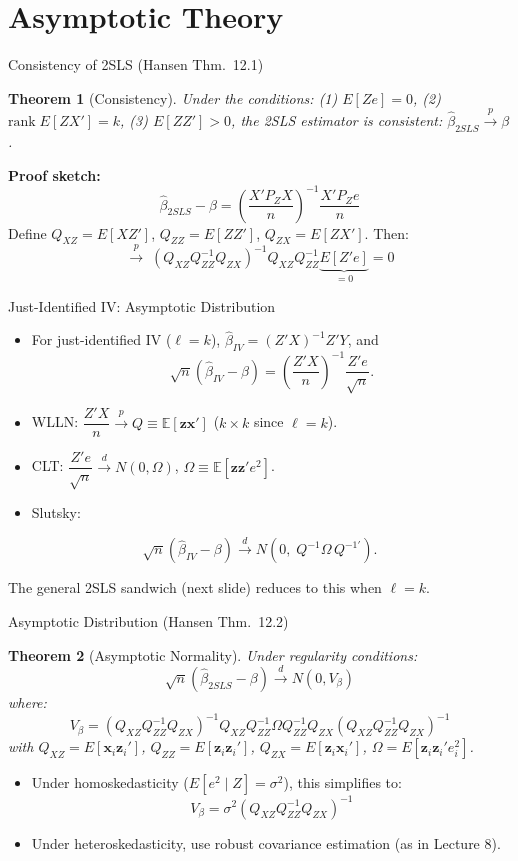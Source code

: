 \documentclass[aspectratio=169, handout]{beamer}
\newtheorem{thm}{Theorem}
\numberwithin{equation}{section}
\begin{document}
\section{Asymptotic Theory}

\begin{frame}{Consistency of 2SLS (Hansen Thm.\ 12.1)}
\begin{thm}[Consistency]
Under the conditions: (1) $E[Ze]=0$, (2) $\text{rank}\;E[ZX']=k$, (3) $E[ZZ']>0$, the 2SLS estimator is consistent: $\hat{\beta}_{2SLS}\xrightarrow{p}\beta$.
\end{thm}
\vspace{0.2cm}
\textbf{Proof sketch:}
$$\hat{\beta}_{2SLS}-\beta = \left(\frac{X'P_ZX}{n}\right)^{-1}\frac{X'P_Ze}{n}$$
Define $Q_{XZ}=E[XZ']$, $Q_{ZZ}=E[ZZ']$, $Q_{ZX}=E[ZX']$.  Then:
$$\xrightarrow{p}\; (Q_{XZ}Q_{ZZ}^{-1}Q_{ZX})^{-1}Q_{XZ}Q_{ZZ}^{-1}\underbrace{E[Z'e]}_{=0} = 0$$
\end{frame}


\begin{frame}{Just-Identified IV: Asymptotic Distribution}
\begin{itemize}
\item For just-identified IV ($\ell=k$), $\hat{\beta}_{IV}=(Z'X)^{-1}Z'Y$, and
$$\sqrt{n}(\hat{\beta}_{IV}-\beta) = \left(\frac{Z'X}{n}\right)^{-1}\frac{Z'e}{\sqrt{n}}.$$
\item WLLN: $\dfrac{Z'X}{n}\xrightarrow{p}Q\equiv\mathbb{E}[\bm{z}\bm{x}']$ ($k\times k$ since $\ell=k$).
\item CLT: $\dfrac{Z'e}{\sqrt{n}}\xrightarrow{d} N(0,\Omega)$, $\Omega\equiv\mathbb{E}[\bm{z}\bm{z}'e^2]$.
\item Slutsky:
\end{itemize}
\begin{tcolorbox}[colback=blue!5, colframe=blue!50]
$$\sqrt{n}(\hat{\beta}_{IV}-\beta)\xrightarrow{d} N\!\left(0,\;Q^{-1}\Omega\, Q^{-1\prime}\right).$$
\end{tcolorbox}
The general 2SLS sandwich (next slide) reduces to this when $\ell=k$.
\end{frame}


\begin{frame}{Asymptotic Distribution (Hansen Thm.\ 12.2)}
\begin{thm}[Asymptotic Normality]
Under regularity conditions:
$$\sqrt{n}(\hat{\beta}_{2SLS}-\beta)\xrightarrow{d} N(0, V_\beta)$$
where:
$$V_\beta = (Q_{XZ}Q_{ZZ}^{-1}Q_{ZX})^{-1}Q_{XZ}Q_{ZZ}^{-1}\Omega Q_{ZZ}^{-1}Q_{ZX}(Q_{XZ}Q_{ZZ}^{-1}Q_{ZX})^{-1}$$
with $Q_{XZ}=E[\bm{x}_i\bm{z}_i']$, $Q_{ZZ}=E[\bm{z}_i\bm{z}_i']$, $Q_{ZX}=E[\bm{z}_i\bm{x}_i']$, $\Omega=E[\bm{z}_i\bm{z}_i'e_i^2]$.
\end{thm}
\begin{itemize}
\item Under homoskedasticity ($E[e^2\mid Z]=\sigma^2$), this simplifies to:
$$V_\beta = \sigma^2(Q_{XZ}Q_{ZZ}^{-1}Q_{ZX})^{-1}$$
\item Under heteroskedasticity, use robust covariance estimation (as in Lecture 8).
\end{itemize}
\end{frame}
\end{document}
